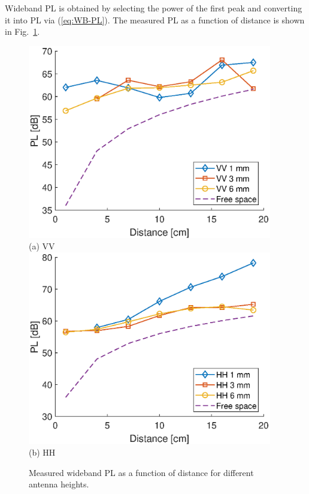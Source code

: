 \documentclass[manuscript]{rsl}
\begin{document}
Wideband PL is obtained by selecting the power of the first peak and converting it into PL via (\ref{eq:WB-PL}). 
The measured PL as a function of distance is shown in Fig.~\ref{fig:PL_vs_dist}. 
\begin{figure}[tb]
\begin{center}
	\includegraphics[width=0.95\textwidth]{figures/PL_vs_dist_VV}
	\\
	(a) VV
	\\
	\includegraphics[width=0.95\textwidth]{figures/PL_vs_dist_HH}
	\\
	(b) HH
\caption{Measured wideband PL as a function of distance for different antenna heights.}
\label{fig:PL_vs_dist}
\end{center}
\end{figure}
\end{document}

